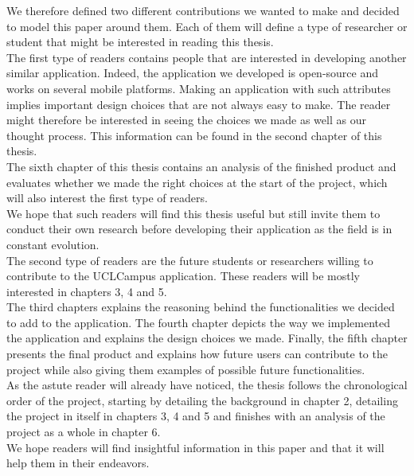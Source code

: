 \documentclass{eplmastersthesis}
\begin{document}
 We therefore defined two different contributions we wanted to make and decided to model this paper around them. Each of them will define a type of researcher or student that might be interested in reading this thesis.\\

The first type of readers contains people that are interested in developing another similar application. Indeed, the application we developed is open-source and works on several mobile platforms. Making an application with such attributes implies important design choices that are not always easy to make. The reader might therefore be interested in seeing the choices we made as well as our thought process. This information can be found in the second chapter of this thesis.\\
The sixth chapter of this thesis contains an analysis of the finished product and evaluates whether we made the right choices at the start of the project, which will also interest the first type of readers.\\
We hope that such readers will find this thesis useful but still invite them to conduct their own research before developing their application as the field is in constant evolution.\\

The second type of readers are the future students or researchers willing to contribute to the UCLCampus application. These readers will be mostly interested in chapters 3, 4 and 5.\\
The third chapters explains the reasoning behind the functionalities we decided to add to the application. The fourth chapter depicts the way we implemented the application and explains the design choices we made. Finally, the fifth chapter presents the final product  and explains how future users can contribute to the project while also giving them examples of possible future functionalities. \\

As the astute reader will already have noticed, the thesis follows the chronological order of the project, starting by detailing the background in chapter 2, detailing the project in itself in chapters 3, 4 and 5 and finishes with an analysis of the project as a whole in chapter 6.\\

We hope readers will find insightful information in this paper and that it will help them in their endeavors.  
\end{document}
